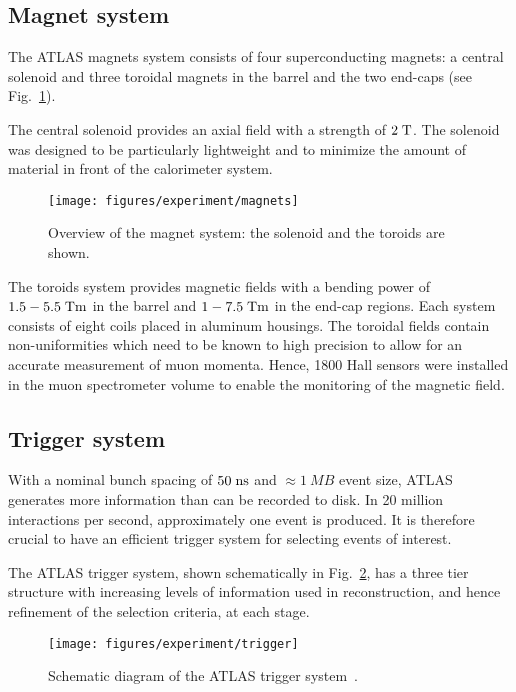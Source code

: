 \subsection{Magnet system}
\label{sec:magnets}

The ATLAS magnets system consists of four superconducting
magnets: a central solenoid and three toroidal magnets in the barrel and the
two end-caps (see Fig.~\ref{fig:magnets}).

The central solenoid provides an axial field with a strength of \mbox{$2 \; \mathrm{T}$}.
The solenoid was designed to be particularly lightweight and to
minimize the amount of material in front of the calorimeter system.

\begin{figure}[ht]
\begin{center}
\texttt{[image: figures/experiment/magnets]}
\caption[Overview of the magnet system]{
  Overview of the magnet system:
  the solenoid and the toroids are shown.}
\label{fig:magnets}
\end{center}
\end{figure}

The toroids system provides magnetic fields with a bending power
of \mbox{$1.5 - 5.5 \; \mathrm{Tm}$} in the barrel and \mbox{$1 - 7.5 \; \mathrm{Tm}$} in the end-cap regions.
Each system consists of eight coils placed in aluminum housings.
The toroidal fields contain non-uniformities which need to be known to
high precision to allow for an accurate measurement of muon momenta.
Hence, 1800 Hall sensors were installed in the muon spectrometer 
volume to enable the monitoring of the magnetic field.


\subsection{Trigger system}
\label{sec:triggerDAQ}

With a nominal bunch spacing of \mbox{$50 \; \mathrm{ns}$} and
\mbox{$\approx{}1~MB$} event size, ATLAS generates more
information than can be recorded to disk. In 20 million 
interactions per second, approximately one \ttbar{} event 
is produced. It is therefore crucial to have an efficient trigger
system for selecting events of interest.

The ATLAS trigger system, shown schematically in
Fig.~\ref{fig:trigger}, has a three tier structure with increasing
levels of information used in reconstruction, and hence refinement of
the selection criteria, at each stage.

\begin{figure}[ht]
\begin{center}
\texttt{[image: figures/experiment/trigger]}
\caption[ATLAS trigger system]{
  Schematic diagram of the ATLAS trigger system~\cite{trigger}. }
\label{fig:trigger}
\end{center}
\end{figure}

